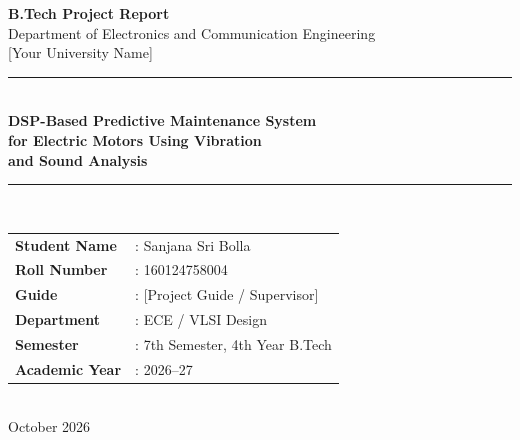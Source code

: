 \documentclass[12pt,a4paper]{article}
\begin{document}

\begin{titlepage}
  \centering
  \vspace*{1cm}

  {\Large \textbf{B.Tech Project Report}}\\[0.4cm]
  {\large Department of Electronics and Communication Engineering}\\[0.2cm]
  {\large [Your University Name]}\\[1.5cm]

  \rule{\linewidth}{1pt}\\[0.5cm]
  {\LARGE \textbf{DSP-Based Predictive Maintenance System\\[0.3cm]
  for Electric Motors Using Vibration\\[0.3cm]
  and Sound Analysis}}\\[0.5cm]
  \rule{\linewidth}{1pt}\\[1.5cm]

  \begin{tabular}{ll}
    \textbf{Student Name}  & : Sanjana Sri Bolla \\[0.4cm]
    \textbf{Roll Number}   & : 160124758004 \\[0.4cm]
    \textbf{Guide}         & : [Project Guide / Supervisor] \\[0.4cm]
    \textbf{Department}    & : ECE / VLSI Design \\[0.4cm]
    \textbf{Semester}      & : 7th Semester, 4th Year B.Tech \\[0.4cm]
    \textbf{Academic Year} & : 2026--27 \\
  \end{tabular}\\[2.5cm]

  {\large October 2026}
\end{titlepage}
\end{document}
